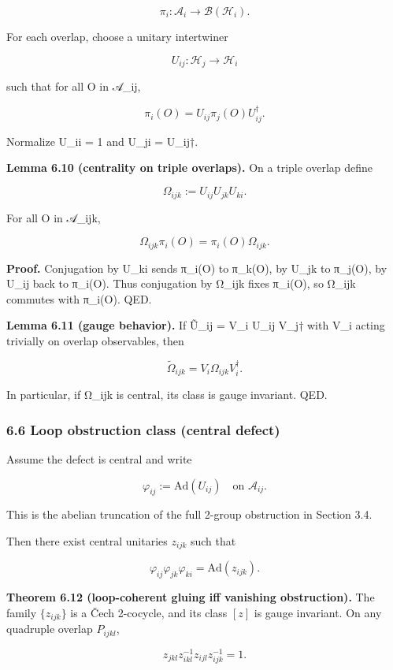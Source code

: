 \[
\pi_i: \mathcal{A}_i \to \mathcal B(\mathcal H_i).
\]

For each overlap, choose a unitary intertwiner

\[
U_{ij}: \mathcal H_j \to \mathcal H_i
\]

such that for all O in 𝒜\_ij,

\[
\pi_i(O) = U_{ij} \pi_j(O) U_{ij}^\dagger.
\]

Normalize U\_ii = 1 and U\_ji = U\_ij†.

\textbf{Lemma 6.10 (centrality on triple overlaps).} On a triple overlap define

\[
\Omega_{ijk} := U_{ij} U_{jk} U_{ki}.
\]

For all O in 𝒜\_ijk,

\[
\Omega_{ijk} \pi_i(O) = \pi_i(O) \Omega_{ijk}.
\]

\textbf{Proof.} Conjugation by U\_ki sends π\_i(O) to π\_k(O), by U\_jk to π\_j(O), by U\_ij back to π\_i(O). Thus conjugation by Ω\_ijk fixes π\_i(O), so Ω\_ijk commutes with π\_i(O). QED.

\textbf{Lemma 6.11 (gauge behavior).} If \~{U}\_ij = V\_i U\_ij V\_j† with V\_i acting trivially on overlap observables, then

\[
\tilde{\Omega}_{ijk} = V_i \Omega_{ijk} V_i^\dagger.
\]

In particular, if Ω\_ijk is central, its class is gauge invariant. QED.

\subsubsection{6.6 Loop obstruction class (central defect)}\label{66-loop-obstruction-class-central-defect}

Assume the defect is central and write

\[
\varphi_{ij} := \mathrm{Ad}(U_{ij}) \quad \text{on } \mathcal{A}_{ij}.
\]

This is the abelian truncation of the full 2-group obstruction in Section 3.4.

Then there exist central unitaries \(z_{ijk}\) such that

\[
\varphi_{ij} \varphi_{jk} \varphi_{ki} = \mathrm{Ad}(z_{ijk}).
\]

\textbf{Theorem 6.12 (loop-coherent gluing iff vanishing obstruction).} The family \(\{z_{ijk}\}\) is a \v{C}ech 2-cocycle, and its class \([z]\) is gauge invariant. On any quadruple overlap \(P_{ijkl}\),

\[
z_{jkl} z_{ikl}^{-1} z_{ijl} z_{ijk}^{-1} = 1.
\]

